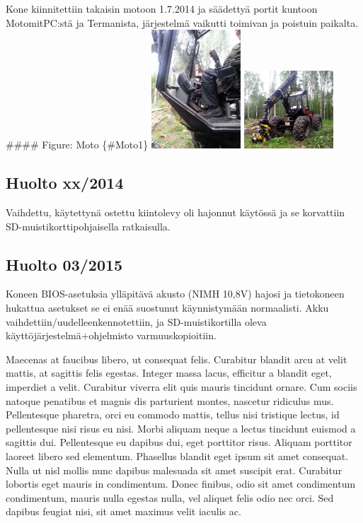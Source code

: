 \documentclass[]{article}
\begin{document}
Kone kiinnitettiin takaisin motoon 1.7.2014 ja säädettyä portit kuntoon
MotomitPC:stä ja Termanista, järjestelmä vaikutti toimivan ja poistuin
paikalta. \#\#\#\# Figure: Moto \{\#Moto1\}
\includegraphics[width=0.250\textwidth]{../pictures/moto_1.jpg}
\includegraphics[width=0.250\textwidth]{../pictures/moto_2.jpg}

\subsection{Huolto xx/2014}\label{huolto-xx2014}

Vaihdettu, käytettynä ostettu kiintolevy oli hajonnut käytössä ja se
korvattiin SD-muistikorttipohjaisella ratkaisulla.

\subsection{Huolto 03/2015}\label{huolto-032015}

Koneen BIOS-asetuksia ylläpitävä akusto (NIMH 10,8V) hajosi ja
tietokoneen hukattua asetukset se ei enää suostunut käynnistymään
normaalisti. Akku vaihdettiin/uudelleenkennotettiin, ja
SD-muistikortilla oleva käyttöjärjestelmä+ohjelmisto varmuuskopioitiin.

Maecenas at faucibus libero, ut consequat felis. Curabitur blandit arcu
at velit mattis, at sagittis felis egestas. Integer massa lacus,
efficitur a blandit eget, imperdiet a velit. Curabitur viverra elit quis
mauris tincidunt ornare. Cum sociis natoque penatibus et magnis dis
parturient montes, nascetur ridiculus mus. Pellentesque pharetra, orci
eu commodo mattis, tellus nisi tristique lectus, id pellentesque nisi
risus eu nisi. Morbi aliquam neque a lectus tincidunt euismod a sagittis
dui. Pellentesque eu dapibus dui, eget porttitor risus. Aliquam
porttitor laoreet libero sed elementum. Phasellus blandit eget ipsum sit
amet consequat. Nulla ut nisl mollis nunc dapibus malesuada sit amet
suscipit erat. Curabitur lobortis eget mauris in condimentum. Donec
finibus, odio sit amet condimentum condimentum, mauris nulla egestas
nulla, vel aliquet felis odio nec orci. Sed dapibus feugiat nisi, sit
amet maximus velit iaculis ac.
\end{document}
